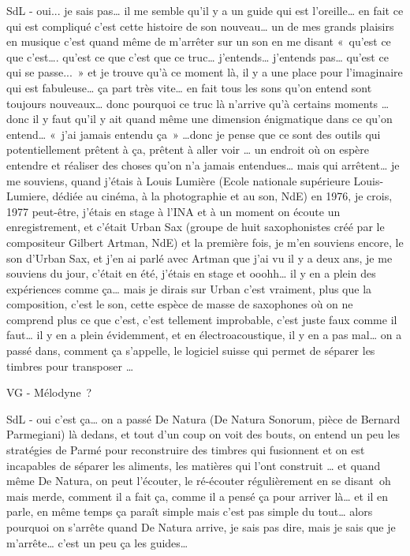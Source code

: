 SdL - oui... je sais pas… il me semble qu'il y a un guide qui est l'oreille… en fait ce qui est compliqué c'est cette histoire de son nouveau… un de mes grands plaisirs en musique c'est quand même de m'arrêter sur un son en me disant « qu'est ce que c'est…. qu'est ce que c'est que ce truc… j'entends… j'entends pas… qu'est ce qui se passe... » et je trouve qu'à ce moment là, il y a une place pour l'imaginaire qui est fabuleuse… ça part très vite… en fait tous les sons qu'on entend sont toujours nouveaux… donc pourquoi ce truc là n'arrive qu'à certains moments … donc il y faut qu'il y ait quand même une dimension énigmatique dans ce qu'on entend… « j'ai jamais entendu ça » …donc je pense que ce sont des outils qui potentiellement prêtent à ça, prêtent à aller voir … un endroit où on espère entendre et réaliser des choses qu'on n'a jamais entendues… mais qui arrêtent… je me souviens, quand j'étais à Louis Lumière (Ecole nationale supérieure Louis-Lumiere, dédiée au cinéma, à la photographie et au son, NdE) en 1976, je crois, 1977 peut-être, j'étais en stage à l'INA et à un moment on écoute un enregistrement, et c'était Urban Sax (groupe de huit saxophonistes créé par le compositeur Gilbert Artman, NdE) et la première fois, je m'en souviens encore, le son d'Urban Sax, et j'en ai parlé avec Artman que j'ai vu il y a deux ans, je me souviens du jour, c'était en été, j'étais en stage et ooohh… il y en a plein des expériences comme ça… mais je dirais sur Urban c'est vraiment, plus que la composition, c'est le son, cette espèce de masse de saxophones où on ne comprend plus ce que c'est, c'est tellement improbable, c'est juste faux comme il faut… il y en a plein évidemment, et en électroacoustique, il y en a pas mal… on a passé dans, comment ça s'appelle, le logiciel suisse qui permet de séparer les timbres pour transposer … 

VG - Mélodyne ? 

SdL - oui c'est ça… on a passé De Natura (De Natura Sonorum, pièce de Bernard Parmegiani) là dedans, et tout d'un coup on voit des bouts, on entend un peu les stratégies de Parmé pour reconstruire des timbres qui fusionnent et on est incapables de séparer les aliments, les matières qui l'ont construit … et quand même De Natura, on peut l'écouter, le ré-écouter régulièrement en se disant oh mais merde, comment il a fait ça,  comme il a pensé ça pour arriver là… et il en parle, en même temps ça paraît simple mais c'est pas simple du tout… alors pourquoi on s'arrête quand De Natura arrive, je sais pas dire, mais je sais que je m'arrête… c'est un peu ça les guides… 

